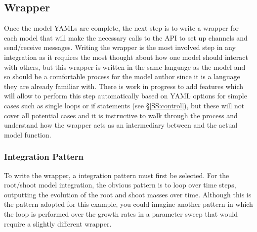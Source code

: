 \documentclass[journal]{IEEEtran}
\newcommand{\todo}[1]{{\color{red}{#1}}}
\newcommand{\pkg}{{\tt \todo{cis\_interface}}{}}
\begin{document}
\subsection{Wrapper}\label{SS:wrapper}
%
Once the model YAMLs are complete, the next step is to write a wrapper for each model that will make the necessary calls to the {\pkg} API to set up channels and send/receive messages. Writing the wrapper is the most involved step in any integration as it requires the most thought about how one model should interact with others, but this wrapper is written in the same language as the model and so should be a comfortable process for the model author since it is a language they are already familiar with. There is work in progress to add features which will allow {\pkg} to perform this step automatically based on YAML options for simple cases such as single loops or if statements (see \S\ref{SS:control}), but these will not cover all potential cases and it is instructive to walk through the process and understand how the wrapper acts as an intermediary between {\pkg} and the actual model function.

\subsubsection{Integration Pattern}
%
To write the wrapper, a integration pattern must first be selected. For the root/shoot model integration, the obvious pattern is to loop over time steps, outputting the evolution of the root and shoot masses over time. Although this is the pattern adopted for this example, you could imagine another pattern in which the loop is performed over the growth rates in a parameter sweep that would require a slightly different wrapper.
\end{document}
